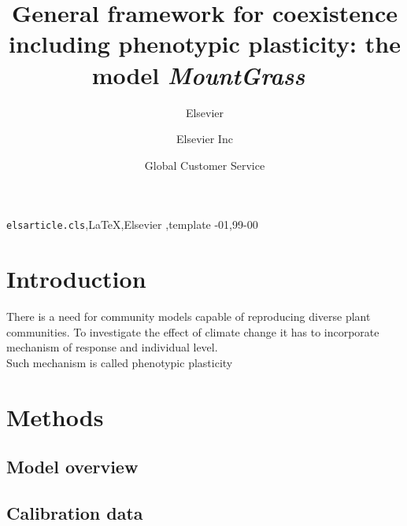 \documentclass[review]{elsarticle}
\newcommand{\model}{\textbf{\textit{MountGrass}}~}
\begin{document}
\begin{frontmatter}

\title{General framework for coexistence including phenotypic plasticity: the model \model}

\author{Elsevier}
\address{Radarweg 29, Amsterdam}

\author[mymainaddress,mysecondaryaddress]{Elsevier Inc}

\author[mysecondaryaddress]{Global Customer Service}

\address[mymainaddress]{1600 John F Kennedy Boulevard, Philadelphia}
\address[mysecondaryaddress]{360 Park Avenue South, New York}

\begin{abstract}
\end{abstract}

\begin{keyword}
\texttt{elsarticle.cls}\sep \LaTeX\sep Elsevier \sep template
-01\sep  99-00
\end{keyword}

\end{frontmatter}

\linenumbers

\section{Introduction}
There is a need for community models capable of reproducing diverse plant communities. To investigate the effect of climate change it has to incorporate mechanism of response and individual level.\\
Such mechanism is called phenotypic plasticity\\

\section{Methods}
\subsection{Model overview}
\subsection{Calibration data}
\end{document}
